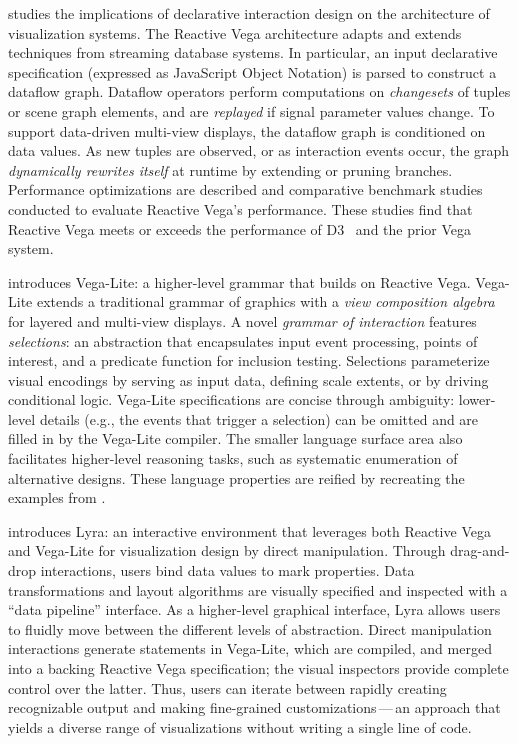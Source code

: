  studies the implications of declarative interaction design on
the architecture of visualization systems. The Reactive Vega architecture adapts
and extends techniques from streaming database systems. In particular, an input
declarative specification (expressed as JavaScript Object Notation) is parsed to
construct a dataflow graph. Dataflow operators perform computations on
\emph{changesets} of tuples or scene graph elements, and are \emph{replayed} if
signal parameter values change. To support data-driven multi-view displays, the
dataflow graph is conditioned on data values. As new tuples are observed, or as
interaction events occur, the graph \emph{dynamically rewrites itself} at
runtime by extending or pruning branches. Performance optimizations are
described and comparative benchmark studies conducted to evaluate Reactive
Vega's performance. These studies find that Reactive Vega meets or exceeds the
performance of D3~\cite{bostock:d3} and the prior Vega system.

 introduces Vega-Lite: a higher-level grammar that builds on
Reactive Vega. Vega-Lite extends a traditional grammar of graphics with a
\emph{view composition algebra} for layered and multi-view displays. A novel
\emph{grammar of interaction} features \emph{selections}: an abstraction that
encapsulates input event processing, points of interest, and a predicate
function for inclusion testing. Selections parameterize visual encodings by
serving as input data, defining scale extents, or by driving conditional logic.
Vega-Lite specifications are concise through ambiguity: lower-level details
(e.g., the events that trigger a selection) can be omitted and are filled in by
the Vega-Lite compiler. The smaller language surface area also facilitates
higher-level reasoning tasks, such as systematic enumeration of alternative
designs. These language properties are reified by recreating the examples from
.

 introduces Lyra: an interactive environment that leverages both
Reactive Vega and Vega-Lite for visualization design by direct manipulation.
Through drag-and-drop interactions, users bind data values to mark properties.
Data transformations and layout algorithms are visually specified and inspected
with a ``data pipeline'' interface. As a higher-level graphical interface, Lyra
allows users to fluidly move between the different levels of abstraction. Direct
manipulation interactions generate statements in Vega-Lite, which are compiled,
and merged into a backing Reactive Vega specification; the visual inspectors
provide complete control over the latter. Thus, users can iterate between
rapidly creating recognizable output and making fine-grained
customizations\,---\,an approach that yields a diverse range of visualizations
without writing a single line of code.

